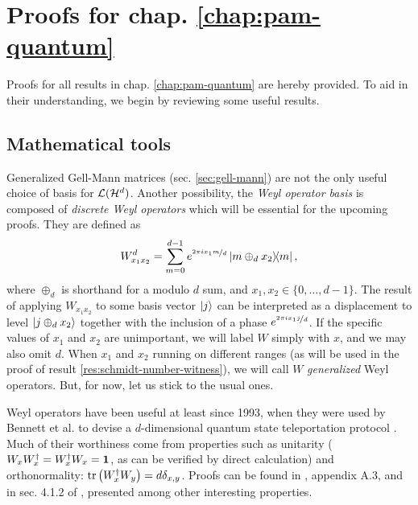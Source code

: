 \chapter{Proofs for chap. \ref{chap:pam-quantum}}
\label{ap:pam-quantum}

Proofs for all results in chap. \ref{chap:pam-quantum} are hereby provided. To aid in their understanding, we begin by reviewing some useful results.

\section*{Mathematical tools}

    Generalized Gell-Mann matrices (sec. \ref{sec:gell-mann}) are not the only useful choice of basis for $\mathcal{L}(\mathcal{H}^{d})$. Another possibility, the \emph{Weyl operator basis} \cite{bertlmann_2008_bloch} is composed of \emph{discrete Weyl operators} which will be essential for the upcoming proofs. They are defined as
    \begin{equation}
        W_{x_1 x_2}^d = \sum_{m = 0}^{d-1} e^{\nicefrac{2 \pi i x_1 m}{d}} \ketbra{m \oplus_d x_2}{m} ,
        \label{eq:weyl-operators}
    \end{equation}
    where $\oplus_d$ is shorthand for a modulo $d$ sum, and $x_1, x_2 \in \{0, \ldots, d-1 \}$. The result of applying $W_{x_1 x_2}$ to some basis vector $\ket{j}$ can be interpreted as a displacement to level $\ket{j \oplus_d x_2}$ together with the inclusion of a phase $e^{\nicefrac{2 \pi i x_1 j}{d}}$. If the specific values of $x_1$ and $x_2$ are unimportant, we will label $W$ simply with $x$, and we may also omit $d$. When $x_1$ and $x_2$ running on different ranges (as will be used in the proof of result \ref{res:schmidt-number-witness}), we will call $W$ \emph{generalized} Weyl operators. But, for now, let us stick to the usual ones.

    Weyl operators have been useful at least since 1993, when they were used by Bennett et al. to devise a $d$-dimensional quantum state teleportation protocol \cite{bennett_1993_teleporting}. Much of their worthiness come from properties such as unitarity ($W_x W_x^\dagger = W_x^\dagger W_x = \mathbf{1}$, as can be verified by direct calculation) and orthonormality: $\text{tr}\left( W_{x}^\dagger W_{y} \right) = d \delta_{x, y}$. Proofs can be found in \cite{bertlmann_2008_bloch}, appendix A.3, and in sec. 4.1.2 of \cite{watrous_book_2018}, presented among other interesting properties.

